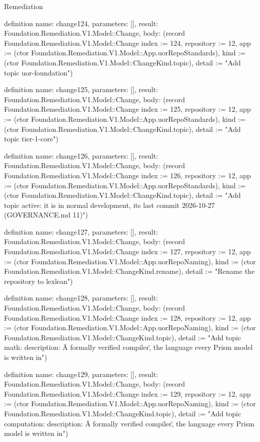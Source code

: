 \begin{lexlean}{Remediation}
\begin{semanticmodule}
definition{
  name: change124,
  parameters: [],
  result: Foundation.Remediation.V1.Model::Change,
  body: (record Foundation.Remediation.V1.Model::Change {index := 124, repository := 12, app := (ctor Foundation.Remediation.V1.Model::App.uorRepoStandards), kind := (ctor Foundation.Remediation.V1.Model::ChangeKind.topic), detail := "Add topic uor-foundation"})
}

definition{
  name: change125,
  parameters: [],
  result: Foundation.Remediation.V1.Model::Change,
  body: (record Foundation.Remediation.V1.Model::Change {index := 125, repository := 12, app := (ctor Foundation.Remediation.V1.Model::App.uorRepoStandards), kind := (ctor Foundation.Remediation.V1.Model::ChangeKind.topic), detail := "Add topic tier-1-core"})
}

definition{
  name: change126,
  parameters: [],
  result: Foundation.Remediation.V1.Model::Change,
  body: (record Foundation.Remediation.V1.Model::Change {index := 126, repository := 12, app := (ctor Foundation.Remediation.V1.Model::App.uorRepoStandards), kind := (ctor Foundation.Remediation.V1.Model::ChangeKind.topic), detail := "Add topic active: it is in normal development, its last commit 2026-10-27 (GOVERNANCE.md 11)"})
}

definition{
  name: change127,
  parameters: [],
  result: Foundation.Remediation.V1.Model::Change,
  body: (record Foundation.Remediation.V1.Model::Change {index := 127, repository := 12, app := (ctor Foundation.Remediation.V1.Model::App.uorRepoNaming), kind := (ctor Foundation.Remediation.V1.Model::ChangeKind.rename), detail := "Rename the repository to lexlean"})
}

definition{
  name: change128,
  parameters: [],
  result: Foundation.Remediation.V1.Model::Change,
  body: (record Foundation.Remediation.V1.Model::Change {index := 128, repository := 12, app := (ctor Foundation.Remediation.V1.Model::App.uorRepoNaming), kind := (ctor Foundation.Remediation.V1.Model::ChangeKind.topic), detail := "Add topic math: description: \"A formally verified compiler\", the language every Prism model is written in"})
}

definition{
  name: change129,
  parameters: [],
  result: Foundation.Remediation.V1.Model::Change,
  body: (record Foundation.Remediation.V1.Model::Change {index := 129, repository := 12, app := (ctor Foundation.Remediation.V1.Model::App.uorRepoNaming), kind := (ctor Foundation.Remediation.V1.Model::ChangeKind.topic), detail := "Add topic computation: description: \"A formally verified compiler\", the language every Prism model is written in"})
}


\end{semanticmodule}
\end{lexlean}
